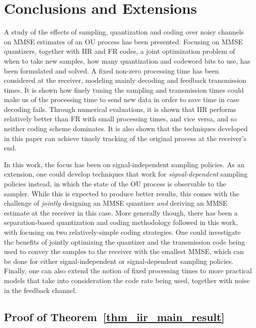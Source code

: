 \documentclass[12pt,journal,onecolumn]{IEEEtran}
\begin{document}
\section{Conclusions and Extensions}

A study of the effects of sampling, quantization and coding over noisy channels on MMSE estimates of an OU process has been presented. Focusing on MMSE quantizers, together with IIR and FR codes, a joint optimization problem of when to take new samples, how many quantization and codeword bits to use, has been formulated and solved. A fixed non-zero processing time has been considered at the receiver, modeling mainly decoding and feedback transmission times. It is shown how finely tuning the sampling and transmission times could make us of the processing time to send new data in order to save time in case decoding fails. Through numerical evaluations, it is shown that IIR performs relatively better than FR with small processing times, and vice versa, and so neither coding scheme dominates. It is also shown that the techniques developed in this paper can achieve timely tracking of the original process at the receiver's end.

In this work, the focus has been on signal-independent sampling policies. As an extension, one could develop techniques that work for {\it signal-dependent} sampling policies instead, in which the state of the OU process is observable to the sampler. While this is expected to produce better results, this comes with the challenge of {\it jointly} designing an MMSE quantizer {\it and} deriving an MMSE estimate at the receiver in this case. More generally though, there has been a separation-based quantization and coding methodology followed in this work, with focusing on two relatively-simple coding strategies. One could investigate the benefits of jointly optimizing the quantizer and the transmission code being used to convey the samples to the receiver with the smallest MMSE, which can be done for either signal-independent or signal-dependent sampling policies. Finally, one can also extend the notion of fixed processing times to more practical models that take into consideration the code rate being used, together with noise in the feedback channel.



\appendix


\subsection{Proof of Theorem~\ref{thm_iir_main_result}} \label{apndx_pf_iir_main_result}
\end{document}
